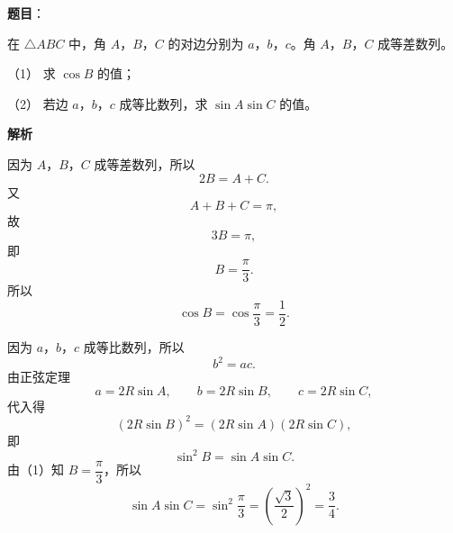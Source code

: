 \begin{answer}

\textbf{题目}：

在 $\triangle ABC$ 中，角 $A$，$B$，$C$ 的对边分别为 $a$，$b$，$c$。角 $A$，$B$，$C$ 成等差数列。

（1） 求 $\cos B$ 的值；

（2） 若边 $a$，$b$，$c$ 成等比数列，求 $\sin A\sin C$ 的值。

\textbf{解析}


因为 $A$，$B$，$C$ 成等差数列，所以
\nopagebreak[4]
\[2B=A+C.\]
又
\nopagebreak[4]
\[A+B+C=\pi,\]
故
\nopagebreak[4]
\[3B=\pi,\]
即
\nopagebreak[4]
\[B=\frac\pi3.\]
所以
\nopagebreak[4]
\[\cos B=\cos\frac\pi3=\frac12.\]


因为 $a$，$b$，$c$ 成等比数列，所以
\nopagebreak[4]
\[b^2=ac.\]
由正弦定理
\nopagebreak[4]
\[a=2R\sin A,\qquad b=2R\sin B,\qquad c=2R\sin C,\]
代入得
\nopagebreak[4]
\[(2R\sin B)^2=(2R\sin A)(2R\sin C),\]
即
\nopagebreak[4]
\[\sin^2B=\sin A\sin C.\]
由（1）知 $B=\dfrac\pi3$，所以
\nopagebreak[4]
\[\sin A\sin C=\sin^2\frac\pi3=\left(\frac{\sqrt3}{2}\right)^2=\frac34.\]



\end{answer}

